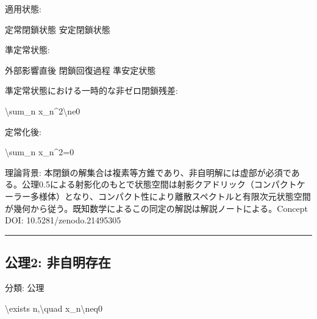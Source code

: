 \documentclass[
  a4paper,
]{ltjsarticle}
\newenvironment{Shaded}{}{}
\newcommand{\NormalTok}[1]{#1}
\begin{document}
適用状態:

\begin{Shaded}
\begin{Highlighting}[]
\NormalTok{定常閉鎖状態}
\NormalTok{安定閉鎖状態}
\end{Highlighting}
\end{Shaded}

準定常状態:

\begin{Shaded}
\begin{Highlighting}[]
\NormalTok{外部影響直後}
\NormalTok{閉鎖回復過程}
\NormalTok{準安定状態}
\end{Highlighting}
\end{Shaded}

準定常状態における一時的な非ゼロ閉鎖残差:

\begin{Shaded}
\begin{Highlighting}[]
\NormalTok{\textbackslash{}sum\_n x\_n\^{}2\textbackslash{}ne0}
\end{Highlighting}
\end{Shaded}

定常化後:

\begin{Shaded}
\begin{Highlighting}[]
\NormalTok{\textbackslash{}sum\_n x\_n\^{}2=0}
\end{Highlighting}
\end{Shaded}

理論背景:
本閉鎖の解集合は複素等方錐であり、非自明解には虚部が必須である。公理0.5による射影化のもとで状態空間は射影クアドリック（コンパクトケーラー多様体）となり、コンパクト性により離散スペクトルと有限次元状態空間が幾何から従う。既知数学によるこの同定の解説は解説ノートによる。Concept
DOI: 10.5281/zenodo.21495305

\begin{center}\rule{0.5\linewidth}{0.5pt}\end{center}

\subsection{公理2:
非自明存在}\label{ux516cux74062-ux975eux81eaux660eux5b58ux5728}

分類: 公理

\begin{Shaded}
\begin{Highlighting}[]
\NormalTok{\textbackslash{}exists n,\textbackslash{}quad x\_n\textbackslash{}neq0}
\end{Highlighting}
\end{Shaded}
\end{document}
